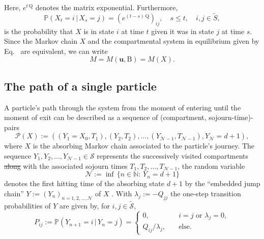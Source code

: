 \documentclass[smallextended]{svjour3}
\makeatletter
\renewcommand*{\eqref}[1]{%
  \hyperref[{#1}]{\textup{\tagform@{\ref*{#1}}}}%
}
\renewcommand{\tens}[1]{\mathrm{#1}}
\renewcommand{\vec}[1]{\mathbf{#1}}
\newcommand{\N}{\mathbb{N}}
\renewcommand{\P}{\mathbb{P}}
\renewcommand{\emph}[1]{``#1''}
\providecommand{\DIFaddtex}[1]{{\protect\color{blue}\uwave{#1}}} %
\providecommand{\DIFdeltex}[1]{{\protect\color{red}\sout{#1}}}                      %
\providecommand{\DIFaddbegin}{} %
\providecommand{\DIFaddend}{} %
\providecommand{\DIFdelbegin}{} %
\providecommand{\DIFdelend}{} %
\providecommand{\DIFadd}[1]{\texorpdfstring{\DIFaddtex{#1}}{#1}} %
\providecommand{\DIFdel}[1]{\texorpdfstring{\DIFdeltex{#1}}{}} %
\newcommand{\DIFscaledelfig}{0.5}
\newlength{\DIFdelgraphicswidth} %
\newlength{\DIFdelgraphicsheight} %
\newcommand{\DIFaddincludegraphics}[2][]{{\color{blue}\fbox{\DIFOincludegraphics[#1]{#2}}}} %
\newcommand{\DIFdelincludegraphics}[2][]{%
\sbox{\DIFdelgraphicsbox}{\DIFOincludegraphics[#1]{#2}}%
\settoboxwidth{\DIFdelgraphicswidth}{\DIFdelgraphicsbox} %
\settoboxtotalheight{\DIFdelgraphicsheight}{\DIFdelgraphicsbox} %
\scalebox{\DIFscaledelfig}{%
\parbox[b]{\DIFdelgraphicswidth}{\usebox{\DIFdelgraphicsbox}\\[-\baselineskip] \rule{\DIFdelgraphicswidth}{0em}}\llap{\resizebox{\DIFdelgraphicswidth}{\DIFdelgraphicsheight}{%
\setlength{\unitlength}{\DIFdelgraphicswidth}%
\begin{picture}(1,1)%
\thicklines\linethickness{2pt} %
{\color[rgb]{1,0,0}\put(0,0){\framebox(1,1){}}}%
{\color[rgb]{1,0,0}\put(0,0){\line( 1,1){1}}}%
{\color[rgb]{1,0,0}\put(0,1){\line(1,-1){1}}}%
\end{picture}%
}\hspace*{3pt}}} %
} %
\DeclareRobustCommand{\DIFaddbegin}{\DIFOaddbegin \let\includegraphics\DIFaddincludegraphics} %
\DeclareRobustCommand{\DIFaddend}{\DIFOaddend \let\includegraphics\DIFOincludegraphics} %
\DeclareRobustCommand{\DIFdelbegin}{\DIFOdelbegin \let\includegraphics\DIFdelincludegraphics} %
\DeclareRobustCommand{\DIFdelend}{\DIFOaddend \let\includegraphics\DIFOincludegraphics} %
\makeatother
\begin{document}
Here, $e^{t\,\tens{Q}}$ denotes the matrix exponential.
Furthermore, 
\begin{equation}
  \P(X_t=i\,|\,X_s=j) = (e^{(t-s)\,\tens{Q}})_{ij},\quad s\leq t,\quad i,j\in\DIFdelbegin %
\DIFdelend \DIFaddbegin \widetilde{S}\DIFaddend ,
\end{equation}
is the probability that $X$ is in state $i$ at time $t$ given it was in state $j$ at time $s$.
Since the Markov chain $X$ and the compartmental system in equilibrium given by Eq.~\eqref{eqn:lin_CS_sys} are equivalent, we can write
\begin{equation}
  M=M(\vec{u},\tens{B}) = M(X).
\end{equation}


\subsection{The path of a single particle}
A particle's path through the system from the moment of entering until the moment of exit can be described as a sequence of (compartment, sojourn-time)-pairs
\begin{equation}
  \label{eqn:path}
  \mathcal{P}(X) := ((Y_1=X_0, T_1),(Y_2,T_2),\ldots,(Y_{\mathcal{N}-1},T_{\mathcal{N}-1}), Y_{\mathcal{N}}=d+1),
\end{equation}
where $X$ is the absorbing Markov chain associated to the particle's journey.
The sequence \DIFdelbegin \DIFdel{$Y_1,Y_2,\ldots,Y_{\mathcal{N}-1}\in\mathcal{S}$ }\DIFdelend \DIFaddbegin \DIFadd{$Y_1,Y_2,\ldots,Y_{\mathcal{N}-1}\in S$ }\DIFaddend represents the successively visited compartments  \DIFdelbegin \DIFdel{along }\DIFdelend with the associated sojourn times $T_1,T_2,\ldots,T_{\mathcal{N}-1}$, the random variable
\begin{equation}
  \mathcal{N}:=\inf\,\{n\in\N:\,Y_n=d+1\}
\end{equation}
denotes the first hitting time of the absorbing state $d+1$ by the \emph{embedded jump chain} $Y:=(Y_n)_{n=1,2,\ldots,\mathcal{N}}$ of $X$ \citep{Norris1997}.
With $\lambda_j:=-Q_{jj}$ the one-step transition probabilities of $Y$ are given by, for \DIFdelbegin \DIFdel{$i,j\in\widetilde{\mathcal{S}}$}\DIFdelend \DIFaddbegin \DIFadd{$i,j\in\widetilde{S}$}\DIFaddend ,
\begin{equation}\label{eqn:P_ij}
  P_{ij}:=\P(Y_{n+1}=i\,|\,Y_n=j) = 
  \begin{cases}
    0,\quad & i=j\text{ or }\lambda_j=0,\\
    Q_{ij}/\lambda_j,\quad & \text{else}.
  \end{cases}
\end{equation}
\end{document}
